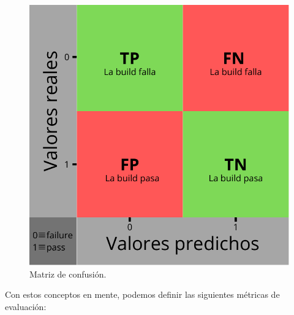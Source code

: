 \begin{figure}[H]
      \centering
      \includegraphics[scale=0.50]{images/Confusion matrix.pdf}
      \caption{Matriz de confusión.}
      \label{fig:confusion_matrix}
  \end{figure}

Con estos conceptos en mente, podemos definir las siguientes métricas de evaluación:

